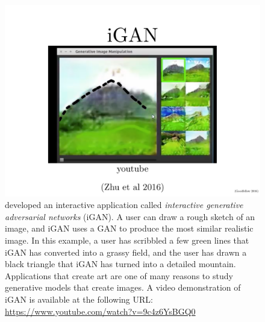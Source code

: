 \begin{figure}
  \centering
  \includegraphics[width=\textwidth]{igan}
  \caption{
    \citet{zhu2016generative} developed an interactive application called {\em interactive generative adversarial networks}
(iGAN). 
A user can draw a rough sketch of an image, and iGAN uses a GAN to produce the most similar
realistic image.
In this example, a user has scribbled a few green lines that iGAN has converted into a grassy
field, and the user has drawn a black triangle that iGAN has turned into a detailed mountain.
Applications that create art are one of many reasons to study generative models that create
images.
A video demonstration of iGAN is available at the following URL:
\url{https://www.youtube.com/watch?v=9c4z6YsBGQ0}
}
  \label{fig:igan}
\end{figure}


